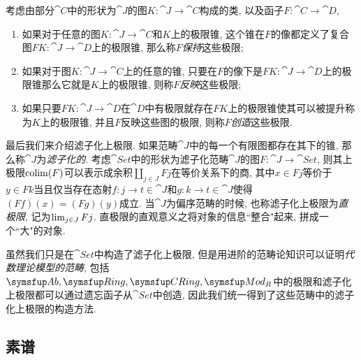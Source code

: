 
考虑由部分$\cat{C}$中的形状为$\cat{J}$的图$K\colon \cat{J}\to\cat{C}$构成的类, 以及函子$F\colon \cat{C}\to\cat{D}$,
\begin{enumerate}
  \item 如果对于任意的图$K\colon\cat{J}\to\cat{C}$和$K$上的极限锥, 这个锥在$F$的像都定义了复合图$FK\colon \cat{J}\to\cat{D}$上的极限锥, 那么称$F$\emph{保持}这些极限;
  \item 如果对于图$K\colon\cat{J}\to\cat{C}$上的任意的锥, 只要在$F$的像下是$FK\colon \cat{J}\to\cat{D}$上的极限锥那么它就是$K$上的极限锥, 则称$F$\emph{反映}这些极限;
  \item 如果只要$FK\colon \cat{J}\to\cat{D}$在$\cat{D}$中有极限就存在$FK$上的极限锥使其可以被提升称为$K$上的极限锥, 并且$F$反映这些图的极限, 则称$F$\emph{创造}这些极限.
\end{enumerate}

最后我们来介绍滤子化上极限. 如果范畴$\cat{J}$中的每一个有限图都存在其下的锥, 那么称$\cat{J}$为\emph{滤子化的}. 考虑$\cat{Set}$中的形状为滤子化范畴$\cat{J}$的图$F\colon \cat{J}\to\cat{Set}$, 则其上极限$\operatorname{colim} (F)$可以表示成余积$\amalg_{j\in J}Fj$在等价关系下的商, 其中$x\in Fj$等价于$y\in Fk$当且仅当存在态射$f\colon j\to t\in\cat{J}$和$g\colon k\to t\in \cat{J}$使得$(Ff)(x)=(Fg)(y)$成立. 当$\cat{J}$为偏序范畴的时候, 也称滤子化上极限为\emph{直极限}, 记为$\operatorname{lim}_{j\in J}Fj$. 直极限的直观意义之将对象的信息``整合"起来, 拼成一个``大"的对象.

虽然我们只是在$\cat{Set}$中构造了滤子化上极限, 但是用进阶的范畴论知识可以证明\emph{代数理论模型的范畴}, 包括$\cat{Ab}, \linebreak[0]\cat{Ring}, \linebreak[0]\cat{CRing}, \linebreak[0]\cat{Mod}_R$中的极限和滤子化上极限都可以通过遗忘函子从$\cat{Set}$中创造\parencite[180; 181, Theorem 5.6.5]{riehl_category_2017}, 因此我们统一得到了这些范畴中的滤子化上极限的构造方法.

\subsection{素谱}\label{subsec:algebra-primespec}

